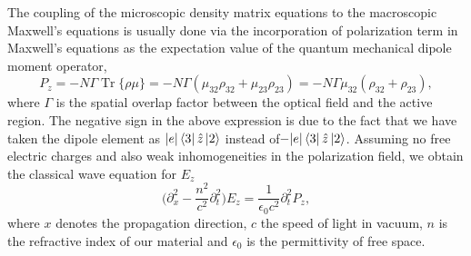 \documentclass[10pt,letterpaper]{article}
\DeclareMathOperator{\Tr}{Tr}
\begin{document}
The coupling of the microscopic density matrix equations to the macroscopic Maxwell's equations is usually done via the incorporation of  polarization term in Maxwell's equations as the expectation value of the quantum mechanical dipole moment operator,
\begin{equation} 
P_z = -N\Gamma \Tr\{\rho \mu\} = -N\Gamma(\mu_{32}\rho_{32} + \mu_{23}\rho_{23}) =  -N\Gamma\mu_{32}(\rho_{32}+\rho_{23}) , \label{eq:fullpolarization}
\end{equation}
where $\Gamma$ is the spatial overlap factor between the optical field  and the active region. The negative sign in the above expression is due to the fact that we have taken the dipole element as $|e| \Bra{3}\hat{z} \Ket{2}$ instead of$-|e| \Bra{3}\hat{z} \Ket{2}$. Assuming no free electric charges and also weak inhomogeneities in the polarization field, we obtain the classical wave equation for  $E_z$
\begin{equation}
\Big (\partial^2_{x} -\frac{n^2}{c^2}\partial^2_{t} \Big) E_z = \frac{1}{\epsilon_0 c^2}\partial^2_t P_z, 
\label{eq:fullwave}
\end{equation}
where $x$ denotes the propagation direction, $c$ the speed of light in vacuum, $n$ is the refractive index of our material and $\epsilon_0$ is the permittivity of free space.
\end{document}
